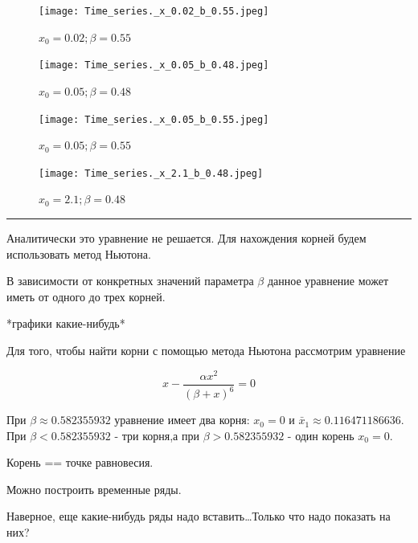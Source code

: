         \begin{figure}[h!]
            \centering
            \texttt{[image: Time\_series.\_x\_0.02\_b\_0.55.jpeg]}

            \caption{\(x_0 = 0.02; \beta = 0.55\)}
            \label{timeSeriesX=0.02b=0.55}
        \end{figure}
    
        \begin{figure}[h!]
            \centering
            \texttt{[image: Time\_series.\_x\_0.05\_b\_0.48.jpeg]}

            \caption{\(x_0 = 0.05; \beta = 0.48\)}
            \label{timeSeriesX=0.05b=0.48}
        \end{figure}
    
        \begin{figure}[h!]
            \centering
            \texttt{[image: Time\_series.\_x\_0.05\_b\_0.55.jpeg]}

            \caption{\(x_0 = 0.05; \beta = 0.55\)}
            \label{timeSeriesX=0.05b=0.55}
        \end{figure}
    
        \begin{figure}[h!]
            \centering
            \texttt{[image: Time\_series.\_x\_2.1\_b\_0.48.jpeg]}

            \caption{\(x_0 = 2.1; \beta = 0.48\)}
            \label{timeSeriesX=2.1b=0.48}
        \end{figure}

        \par\noindent\rule{\textwidth}{1pt}

        Аналитически это уравнение не решается. Для нахождения корней будем использовать метод Ньютона.

        В зависимости от конкретных значений параметра \(\beta\) данное уравнение может иметь от одного до трех корней.
    
        *графики какие-нибудь*

        Для того, чтобы найти корни с помощью метода Ньютона рассмотрим уравнение 
    
        \[x - \frac{\alpha x^2}{(\beta + x)^6} = 0\]

        При \(\beta \approx 0.582355932\) уравнение имеет два корня: \(x_0 = 0\) и \(\bar{x}_1 \approx 0.116471186636\). При \(\beta < 0.582355932\) - три корня,а при \(\beta > 0.582355932\) - один корень \(x_0 = 0\).
    
        Корень == точке равновесия.

        Можно построить временные ряды.

        Наверное, еще какие-нибудь ряды надо вставить\dots Только что надо показать на них?
